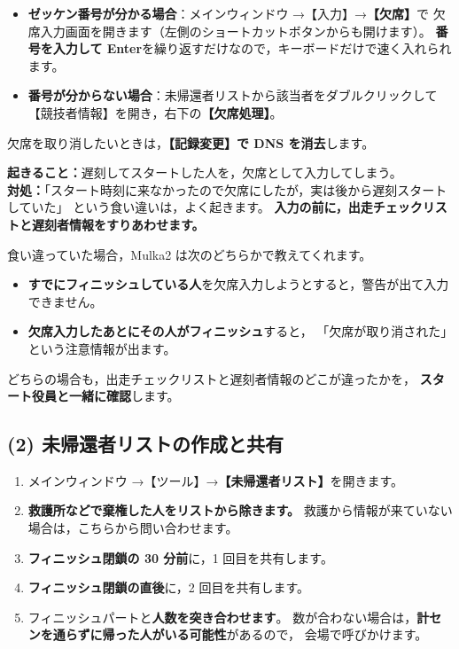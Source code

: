 \begin{itemize}
\item \textbf{ゼッケン番号が分かる場合}：メインウィンドウ →【入力】→\textbf{【欠席】}で
      欠席入力画面を開きます（左側のショートカットボタンからも開けます）。
      \textbf{番号を入力して Enter}を繰り返すだけなので，キーボードだけで速く入れられます。
\item \textbf{番号が分からない場合}：未帰還者リストから該当者をダブルクリックして
      【競技者情報】を開き，右下の\textbf{【欠席処理】}。
\end{itemize}

欠席を取り消したいときは，\textbf{【記録変更】で DNS を消去}します。

\begin{Fail}
\textbf{起きること：}遅刻してスタートした人を，欠席として入力してしまう。\\
\textbf{対処：}「スタート時刻に来なかったので欠席にしたが，実は後から遅刻スタートしていた」
という食い違いは，よく起きます。
\textbf{入力の前に，出走チェックリストと遅刻者情報をすりあわせます。}

食い違っていた場合，Mulka2 は次のどちらかで教えてくれます。
\begin{itemize}
\item \textbf{すでにフィニッシュしている人}を欠席入力しようとすると，警告が出て入力できません。
\item \textbf{欠席入力したあとにその人がフィニッシュ}すると，
      「欠席が取り消された」という注意情報が出ます。
\end{itemize}
どちらの場合も，出走チェックリストと遅刻者情報のどこが違ったかを，
\textbf{スタート役員と一緒に確認}します。
\end{Fail}

\subsection*{(2) 未帰還者リストの作成と共有}

\begin{enumerate}
\item メインウィンドウ →【ツール】→\textbf{【未帰還者リスト】}を開きます。\ver
\item \textbf{救護所などで棄権した人をリストから除きます。}
      救護から情報が来ていない場合は，こちらから問い合わせます。
\item \textbf{フィニッシュ閉鎖の 30 分前}に，1 回目を共有します。
\item \textbf{フィニッシュ閉鎖の直後}に，2 回目を共有します。
\item フィニッシュパートと\textbf{人数を突き合わせます}。
      数が合わない場合は，\textbf{計センを通らずに帰った人がいる可能性}があるので，
      会場で呼びかけます。
\end{enumerate}


